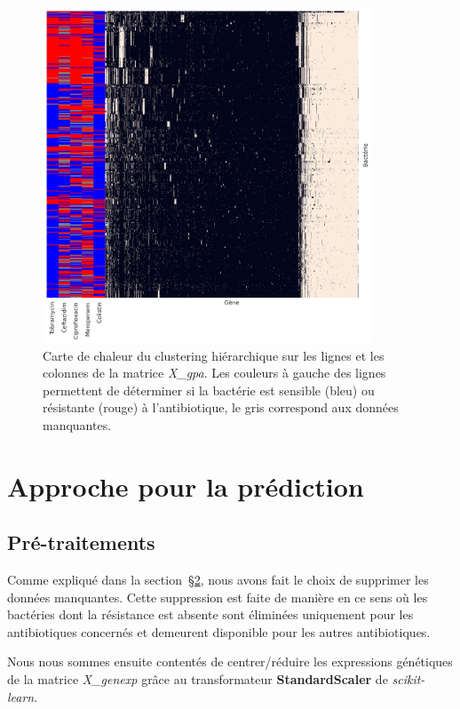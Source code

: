 \documentclass[11pt]{article}
\begin{document}
  \begin{figure}[H]
    \centering
    \includegraphics[height=10cm,width=\textwidth,keepaspectratio]{gpa_cm}
    \caption{Carte de chaleur du clustering hiérarchique sur les lignes et les colonnes de la matrice \textit{X\_gpa}.
    Les couleurs à gauche des lignes permettent de déterminer si la bactérie est sensible (bleu) ou résistante (rouge) à l'antibiotique, le gris correspond aux données manquantes.}
    \label{fig:gpa_cm}
  \end{figure}

\hypertarget{approche-prediction}{%
\section{Approche pour la prédiction}\label{approche-prediction}}

\hypertarget{pre-traitements}{%
\subsection{Pré-traitements}\label{pre-traitements}}

  Comme expliqué dans la section~\hyperref[exploration-donnees]{\S2}, nous avons fait le choix de supprimer les données manquantes.
  Cette suppression est faite de manière  en ce sens où les bactéries dont la résistance est absente sont éliminées uniquement pour les antibiotiques concernés et demeurent disponible pour les autres antibiotiques.

  Nous nous sommes ensuite contentés de centrer/réduire les expressions génétiques de la matrice \textit{X\_genexp} grâce au transformateur \textbf{StandardScaler} de \textit{scikit-learn}.
\end{document}
